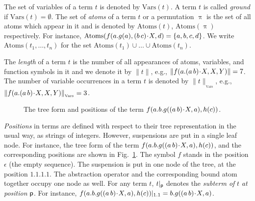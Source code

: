 \documentclass[11pt,a4paper]{amsart}
\theoremstyle{definition}
\newcommand{\vars}{\mathrm{Vars}}
\newcommand{\swap}[2]{\ensuremath{(#1\, #2)}}
\newcommand{\permap}{{\mkern 1mu\cdot \mkern 1mu}}
\newcommand\pos{{\sf p}}
\newcommand\ppi{\uppi}
\newcommand{\len}[1]{{\|#1\|}}
\newcommand{\vcard}[1]{\|#1\|_{_{\vars}}}
\newcommand{\atoms}{\mathrm{Atoms}}
\begin{document}
The set of variables of a term $t$ is denoted by $\vars(t)$. A term
$t$ is called \emph{ground} if $\vars(t)=\emptyset$. The set of
\emph{atoms} of a term $t$ or a permutation $\ppi$ is the set of all
atoms which appear in it and is denoted by $\atoms(t)$, $\atoms(\ppi)$
respectively. For instance, $\atoms(f(a.g(a), \swap{b}{c}\permap X,
d)=\{a,b,c,d\}$. We write $\atoms(t_1,\dots,t_n)$ for the set
$\atoms(t_1)\cup\dots\cup\atoms(t_n)$.

The \emph{length} of a term $t$ is the number of all appearances of
atoms, variables, and function symbols in it and we denote it by
$\len{t}$, e.g., $\len{f(a.\swap{a}{b} \permap X,X,Y)}=7$. The number
of variable occurrences in a term $t$ is denoted by $\vcard{t}$, e.g.,
$\vcard{f(a. \swap{a}{b} \permap X,X,Y)}=3$.

  \begin{figure}
\caption{The tree form and positions of the term $f(a.b.g(\swap{a}{b}\permap X,a), h(c))$.}
\label{fig:tree}
\end{figure}

\emph{Positions} in terms are defined with respect to their tree
representation in the usual way, as strings of integers. However,
suspensions are put in a single leaf node. For instance, the
tree form of the term $f(a.b.g(\swap{a}{b}\permap X,a), h(c))$, and
the corresponding positions are shown in Fig.~\ref{fig:tree}. The
symbol $f$ stands in the position $\epsilon$ (the empty sequence). The
suspension is put in one node of the tree, at the position
$1.1.1.1$. The abstraction operator and the corresponding bound atom
together occupy one node as well. For any term $t$, $t|_\pos$ denotes
the \emph{subterm of} $t$ \emph{at position} $\pos$. For instance,
$f(a.b.g(\swap{a}{b}\permap X,a), h(c))|_{1.1}=b.g(\swap{a}{b}\permap X,a)$.
\end{document}
